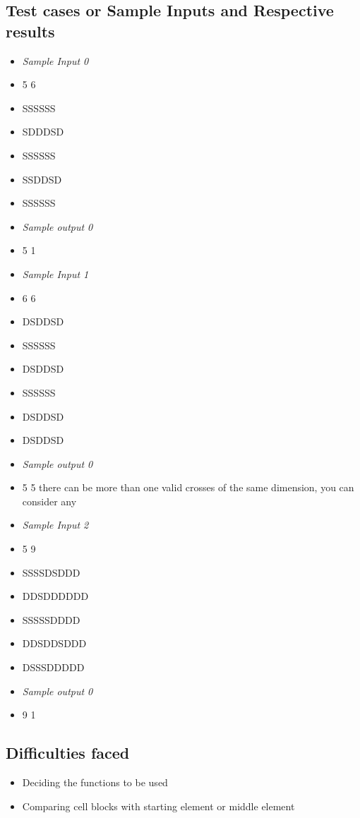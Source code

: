 \documentclass[10pt]{article}
\begin{document}
\subsection{Test cases or Sample Inputs and Respective results}
\begin{itemize}
		\item \textit{Sample Input 0}
		\item 5 6 
		\item SSSSSS
		\item SDDDSD
		\item SSSSSS
		\item SSDDSD
		\item SSSSSS
		
		\item \textit{Sample output 0}
		\item 5 1
		
		\item \textit{Sample Input 1}
		\item 6 6 
		\item DSDDSD
		\item SSSSSS
		\item DSDDSD
		\item SSSSSS
		\item DSDDSD
		\item DSDDSD
		
		\item \textit{Sample output 0}
		\item 5 5 there can be more than one valid crosses of the same dimension, you can consider any
		
		\item \textit{Sample Input 2}
		\item 5 9 
		\item SSSSDSDDD
		\item DDSDDDDDD
		\item SSSSSDDDD
		\item DDSDDSDDD
		\item DSSSDDDDD
		
		\item \textit{Sample output 0}
		\item 9 1
\end{itemize}

\subsection{Difficulties faced}
\begin{itemize}
	\item Deciding the functions to be used
	\item Comparing cell blocks with starting element or middle element
\end{itemize}
\end{document}
